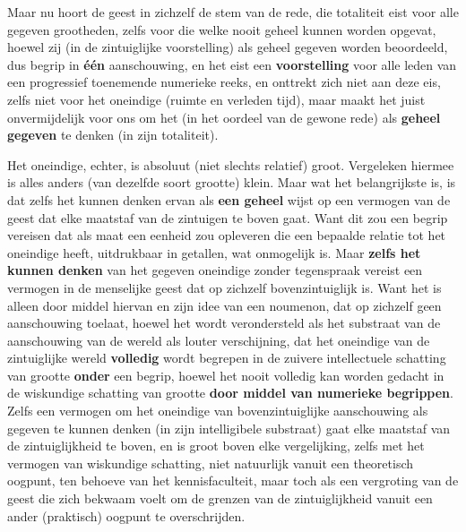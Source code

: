 Maar nu hoort de geest in zichzelf de stem van de rede, die totaliteit eist voor alle gegeven grootheden, zelfs voor die welke nooit geheel kunnen worden opgevat, hoewel zij (in de zintuiglijke voorstelling) als geheel gegeven worden beoordeeld, dus begrip in \textbf{één} aanschouwing, en het eist een \textbf{voorstelling} voor alle leden van een progressief toenemende numerieke reeks, en onttrekt zich niet aan deze eis, zelfs niet voor het oneindige (ruimte en verleden tijd), maar maakt het juist onvermijdelijk voor ons om het (in het oordeel van de gewone rede) als \textbf{geheel gegeven} te denken (in zijn totaliteit).

Het oneindige, echter, is absoluut (niet slechts relatief) groot. Vergeleken hiermee is alles anders (van dezelfde soort grootte) klein. Maar wat het belangrijkste is, is dat zelfs het kunnen denken ervan als \textbf{een geheel} wijst op een vermogen van de geest dat elke maatstaf van de zintuigen te boven gaat. Want dit zou een begrip vereisen dat als maat een eenheid zou opleveren die een bepaalde relatie tot het oneindige heeft, uitdrukbaar in getallen, wat onmogelijk is. Maar \textbf{zelfs het kunnen denken} van het gegeven oneindige zonder tegenspraak vereist een vermogen in de menselijke geest dat op zichzelf bovenzintuiglijk is. Want het is alleen door middel hiervan en zijn idee van een noumenon, dat op zichzelf geen aanschouwing toelaat, hoewel het wordt verondersteld als het substraat van de aanschouwing van de wereld als louter verschijning, dat het oneindige van de zintuiglijke wereld \textbf{volledig} wordt begrepen in de zuivere intellectuele schatting van grootte \textbf{onder} een begrip, hoewel het nooit volledig kan worden gedacht in de wiskundige schatting van grootte \textbf{door middel van numerieke begrippen}. Zelfs een vermogen om het oneindige van bovenzintuiglijke aanschouwing als gegeven te kunnen denken (in zijn intelligibele substraat) gaat elke maatstaf van de zintuiglijkheid te boven, en is groot boven elke vergelijking, zelfs met het vermogen van wiskundige schatting, niet natuurlijk vanuit een theoretisch oogpunt, ten behoeve van het kennisfaculteit, maar toch als een vergroting van de geest die zich bekwaam voelt om de grenzen van de zintuiglijkheid vanuit een ander (praktisch) oogpunt te overschrijden.

